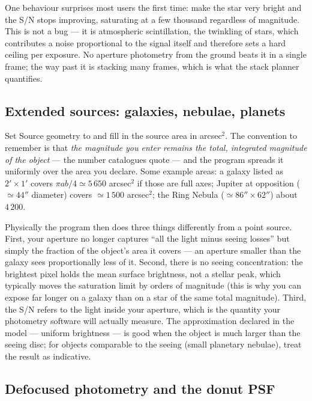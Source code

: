 One behaviour surprises most users the first time: make the star very
bright and the S/N stops improving, saturating at a few thousand
regardless of magnitude. This is not a bug --- it is atmospheric
scintillation, the twinkling of stars, which contributes a noise
proportional to the signal itself and therefore sets a hard ceiling per
exposure. No aperture photometry from the ground beats it in a single
frame; the way past it is stacking many frames, which is what the stack
planner quantifies.

\subsection{Extended sources: galaxies, nebulae, planets}

Set \textsf{Source geometry} to  and fill in the source
area in arcsec$^2$. The convention to remember is that \emph{the
magnitude you enter remains the total, integrated magnitude of the
object} --- the number catalogues quote --- and the program spreads it
uniformly over the area you declare. Some example areas: a galaxy listed
as $2' \times 1'$ covers $\pi ab/4 \simeq 5\,650$ arcsec$^2$ if those are
full axes; Jupiter at opposition ($\simeq44''$ diameter) covers
$\simeq1\,500$ arcsec$^2$; the Ring Nebula ($\simeq 86'' \times 62''$)
about $4\,200$.

Physically the program then does three things differently from a point
source. First, your aperture no longer captures ``all the light minus
seeing losses'' but simply the fraction of the object's area it covers
--- an aperture smaller than the galaxy sees proportionally less of it.
Second, there is no seeing concentration: the brightest pixel holds the
mean surface brightness, not a stellar peak, which typically moves the
saturation limit by orders of magnitude (this is why you can expose far
longer on a galaxy than on a star of the same total magnitude). Third,
the S/N refers to the light inside your aperture, which is the quantity
your photometry software will actually measure. The approximation
declared in the model --- uniform brightness --- is good when the object
is much larger than the seeing disc; for objects comparable to the
seeing (small planetary nebulae), treat the result as indicative.

\subsection{Defocused photometry and the donut PSF}
\label{sec:defocus-guide}

